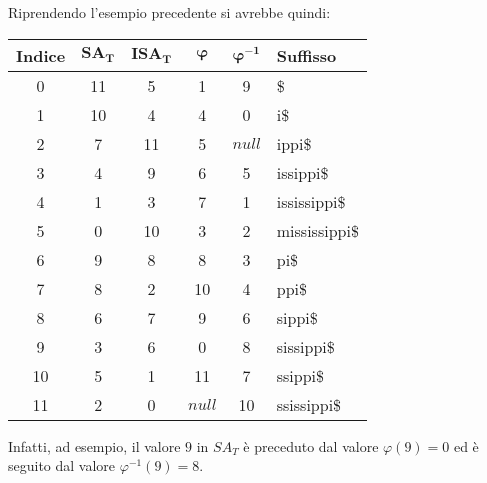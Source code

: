 \begin{esempio}
   Riprendendo l'esempio precedente si avrebbe quindi:
   \begin{table}[H]
     \centering
     \footnotesize
     \begin{tabular}{c|c|c|c|c|l} 
       \textbf{Indice} & $\mathbf{SA_T}$ & $\mathbf{ISA_T}$
       & $\mathbf{\boldsymbol\varphi}$
       & $\mathbf{\boldsymbol\varphi^{-1}}$ & \textbf{Suffisso}\\  
       \hline
       0 & 11 & 5 & 1 & 9 & \$\\
       1 & 10 & 4 & 4 & 0 & i\$\\
       2 & 7 & 11 & 5 & $null$ & ippi\$\\
       3 & 4 & 9 & 6 & 5 & issippi\$\\
       4 & 1 & 3 & 7 & 1 & ississippi\$\\
       5 & 0 & 10 & 3 & 2 & mississippi\$\\
       6 & 9 & 8 & 8 & 3 & pi\$\\
       7 & 8 & 2 & 10 & 4 & ppi\$\\
       8 & 6 & 7 & 9 & 6 & sippi\$\\
       9 & 3 & 6 & 0 & 8 & sissippi\$\\
       10 & 5 & 1 & 11 & 7 & ssippi\$\\
       11 & 2 & 0 & $null$ & 10 & ssissippi\$\\
     \end{tabular}
   \end{table}
  Infatti, ad esempio, il valore $9$ in $SA_T$ è preceduto dal valore
  $\varphi(9)=0$ ed è seguito dal valore $\varphi^{-1}(9)=8$.
\end{esempio}
